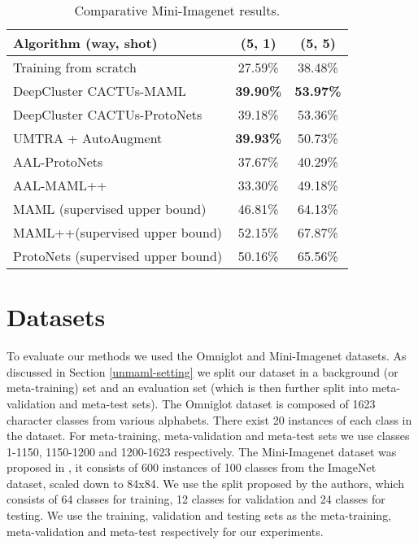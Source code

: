 \documentclass{article}
\newcommand{\umaml}{AAL-MAML++}
\newcommand{\maml}{MAML++}
\newcommand{\uproto}{AAL-ProtoNets}
\begin{document}
\begin{table}
\begin{center}
\begin{tabular}{@{}lcc@{}}
\toprule
Algorithm \hfill (way, shot) & (5, 1) & (5, 5) \\ 
\midrule
Training from scratch & 27.59\% & 38.48\% \\
DeepCluster CACTUs-MAML & \textbf{39.90\%} & \textbf{53.97\%} \\
DeepCluster CACTUs-ProtoNets & 39.18\% & 53.36\% \\
UMTRA + AutoAugment          & \textbf{39.93\%} & 50.73\% \\
\uproto                      & 37.67\% & 40.29\% \\
\umaml                       & 33.30\% & 49.18\% \\
\midrule
MAML (supervised upper bound) & 46.81\% & 64.13\% \\
\maml (supervised upper bound) & 52.15\% & 67.87\% \\
ProtoNets (supervised upper bound) & 50.16\% & 65.56\% \\
\bottomrule
\end{tabular}
\caption{Comparative Mini-Imagenet results.}
\label{table:compare-mini-imagenet}
\end{center}
\vspace{-10mm}
\end{table}




\section{Datasets}\label{dataset-umaml}
To evaluate our methods we used the Omniglot and Mini-Imagenet datasets. As discussed in Section \ref{unmaml-setting} we split our dataset in a background (or meta-training) set and an evaluation set (which is then further split into meta-validation and meta-test sets). The Omniglot dataset is composed of 1623 character classes from various alphabets. There exist 20 instances of each class in the dataset. For meta-training, meta-validation and meta-test sets we use classes 1-1150, 1150-1200 and 1200-1623 respectively.
The Mini-Imagenet dataset was proposed in \citet{ravi2016optimization}, it consists of 600 instances of 100 classes from the ImageNet dataset, scaled down to 84x84. We use the split proposed by the authors, which consists of 64 classes for training, 12 classes for validation and 24 classes for testing. We use the training, validation and testing sets as the meta-training, meta-validation and meta-test respectively for our experiments.
\end{document}
